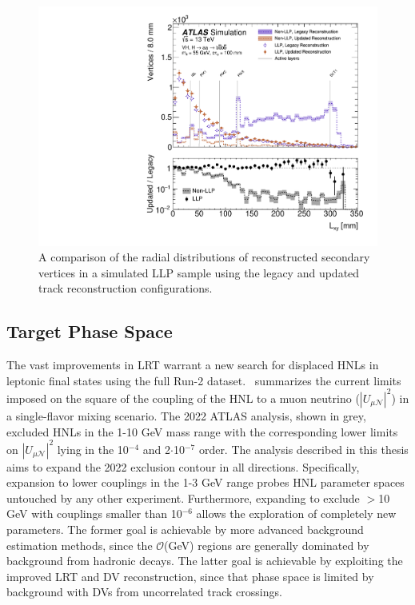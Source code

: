 \begin{figure}[!ht]
    \centering
    \includegraphics[width=0.6\linewidth]{figures//analysis_overview/LRT_fakeRate.pdf}
    \caption{A comparison of the radial distributions of reconstructed secondary vertices in a simulated LLP sample using the legacy and updated track reconstruction configurations.~\cite{IDTR-2021-03}}
    \label{fig:LRT-fakeRate}
\end{figure}


\subsection{Target Phase Space}

The vast improvements in LRT warrant a new search for displaced HNLs in leptonic final states using the full Run-2 dataset.~ summarizes the current limits imposed on the square of the coupling of the HNL to a muon neutrino ($|U_{\mu\mathcal{N}}|^2$) in a single-flavor mixing scenario. The 2022 ATLAS analysis, shown in grey, excluded HNLs in the 1-10 GeV mass range with the corresponding lower limits on $|U_{\mu\mathcal{N}}|^2$ lying in the 10$^{-4}$ and 2$\cdot$10$^{-7}$ order. The analysis described in this thesis aims to expand the 2022 exclusion contour in all directions. Specifically, expansion to lower couplings in the 1-3 GeV \mhnl range probes HNL parameter spaces untouched by any other experiment. Furthermore, expanding to exclude \mhnl$>$10 GeV with couplings smaller than 10$^{-6}$ allows the exploration of completely new parameters. The former goal is achievable by more advanced background estimation methods, since the $\mathcal{O}$(GeV) \mhnl regions are generally dominated by background from hadronic decays. The latter goal is achievable by exploiting the improved LRT and DV reconstruction, since that phase space is limited by background with DVs from uncorrelated track crossings.

